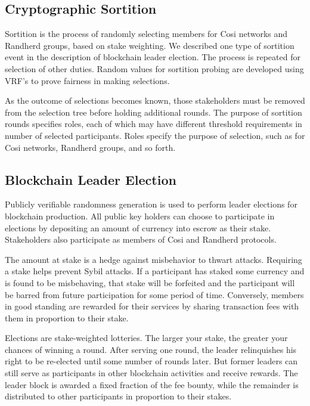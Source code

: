 \documentclass{yellowpaper}
\begin{document}
\subsection{Cryptographic Sortition}
Sortition\cite{algorand} is the process of randomly selecting members for Cosi networks and Randherd groups, based on stake weighting. We described one type of sortition event in the description of blockchain leader election. The process is repeated for selection of other duties. Random values for sortition probing are developed using VRF's to prove fairness in making selections.

As the outcome of selections becomes known, those stakeholders must be removed from the selection tree before holding additional rounds. The purpose of sortition rounds specifies roles, each of which may have different threshold requirements in number of selected participants. Roles specify the purpose of selection, such as for Cosi networks, Randherd groups, and so forth.

\subsection{Blockchain Leader Election}
Publicly verifiable randomness generation is used to perform leader elections for blockchain production. All public key holders can choose to participate in elections by depositing an amount of currency into escrow as their stake. Stakeholders also participate as members of Cosi and Randherd protocols.

The amount at stake is a hedge against misbehavior to thwart attacks.  Requiring a stake helps prevent Sybil attacks. If a participant has staked some currency and is found to be misbehaving, that stake will be forfeited and the participant will be barred from future participation for some period of time. Conversely, members in good standing are rewarded for their services by sharing transaction fees with them in proportion to their stake.

Elections are stake-weighted lotteries. The larger your stake, the greater your chances of winning a round. After serving one round, the leader relinquishes his right to be re-elected until some number of rounds later. But former leaders can still serve as participants in other blockchain activities and receive rewards. The leader block is awarded a fixed fraction of the fee bounty, while the remainder is distributed to other participants in proportion to their stakes.
\end{document}
